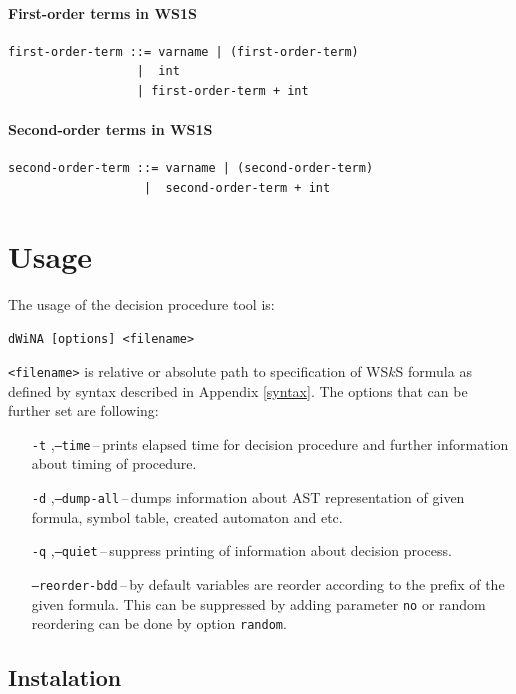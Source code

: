 \subsubsection{First-order terms in WS1S}
\begin{verbatim}
first-order-term ::= varname | (first-order-term)
                  |  int
                  | first-order-term + int
\end{verbatim}

\subsubsection{Second-order terms in WS1S}
\begin{verbatim}
second-order-term ::= varname | (second-order-term)
                   |  second-order-term + int
\end{verbatim}

\chapter{Usage}
The usage of the decision procedure tool is:
\begin{center}
 \texttt{dWiNA [options] <filename>}
\end{center}
\texttt{<filename>} is relative or absolute path to specification of WS$k$S
formula as defined by syntax described in Appendix \ref{syntax}. The options
that can be further set are following:
\begin{itemize}
  \item[\texttt{-t}],\texttt{--time}\,--\,prints elapsed time for decision
  procedure and further information about timing of procedure.
  \item[\texttt{-d}],\texttt{--dump-all}\,--\,dumps information about AST
  representation of given formula, symbol table, created automaton and etc.
  \item[\texttt{-q}],\texttt{--quiet}\,--\,suppress printing of information
  about decision process.
  \item[]\texttt{--reorder-bdd}\,--\,by default variables are reorder according
  to the prefix of the given formula. This can be suppressed by adding parameter
  \texttt{no} or random reordering can be done by option \texttt{random}.
\end{itemize}

\section{Instalation}

